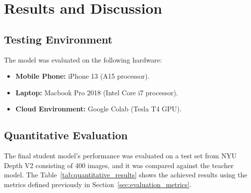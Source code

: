 \chapter{Results and Discussion}
\label{chap:results}

\section{Testing Environment}
\label{sec:test_env}

The model was evaluated on the following hardware:
\begin{itemize}
    \item \textbf{Mobile Phone:} iPhone 13 (A15 processor).
    \item \textbf{Laptop:} Macbook Pro 2018 (Intel Core i7 processor).
    \item \textbf{Cloud Environment:} Google Colab (Tesla T4 GPU).
\end{itemize}

\section{Quantitative Evaluation}
\label{sec:quantitative_eval}

The final student model's performance was evaluated on a test set from NYU Depth V2 consisting of 400 images, and it was compared against the teacher model.
The Table~\ref{tab:quantitative_results} shows the achieved results using the metrics defined previously in Section~\ref{sec:evaluation_metrics}.

\begin{table}[htbp!]
    \centering
    \caption{Quantitative Evaluation of the Student Model.}
    \label{tab:quantitative_results}
\end{table}

